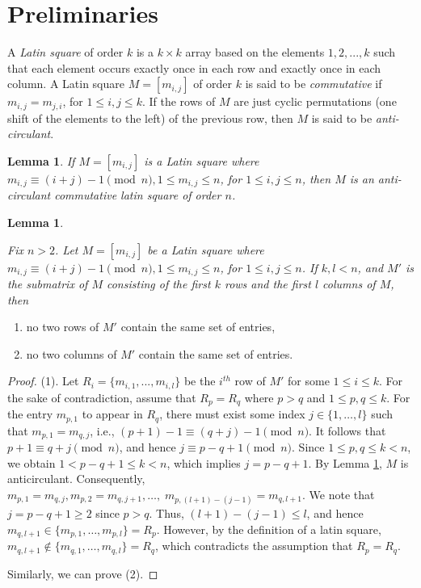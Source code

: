 \documentclass[12pt]{article}
\theoremstyle{definition}
\newtheorem{lem}[defn]{Lemma}
\begin{document}
\section{Preliminaries} 

A {\em Latin square} of order $k$ is a $k \times k$ array based on the elements $1, 2,...,k$ such that each element occurs exactly once in each row and exactly once in each column. A Latin square $M = [m_{i,j}]$ of order $k$ is said to be {\em commutative} if $m_{i,j} = m_{j,i}$, for $1 \leq i, j \leq k$. If the rows of $M$ are just cyclic permutations (one shift of the elements to the left) of the previous row, then $M$ is said to be {\em anti-circulant}.

\begin{lem}\label{Lemma 2.1}
{\em If $M = [m_{i,j}]$ is a Latin square where $m_{i,j} \equiv (i + j)-1 \pmod{n}, 1 \leq m_{i,j} \leq n$, for $1 \leq i, j \leq n$, then $M$ is an anti-circulant commutative latin square of order $n$.} 
\end{lem}

\begin{lem}\label{Lemma 2.2}
    {\em Fix $n>2$. Let $M = [m_{i,j}]$ be a Latin square where $m_{i,j} \equiv (i + j)-1 \pmod{n}, 1 \leq m_{i,j} \leq n$, for $1 \leq i, j \leq n$. If $k,l<n$, and $M'$ is the submatrix of $M$ consisting of the first $k$ rows and the first $l$ columns of $M$, then 
    \begin{enumerate}
        \item no two rows of $M'$ contain the same set of entries,
        \item no two columns of $M'$ contain the same set of entries.
    \end{enumerate}
    }
\end{lem}

\begin{proof}
(1). 
Let $R_i=\{m_{i,1},...,m_{i,l}\}$ be the $i^{th}$ row of $M'$ for some $1\leq i\leq k$.
For the sake of contradiction, assume that 
$R_p=R_{q}$ where $p> q$ and $1\leq p,q\leq k$.  
For the entry $m_{p,1}$ to appear in $R_q$, there must exist some index $j \in \{1, \dots, l\}$ such that
$m_{p,1}=m_{q,j}$, i.e.,
$
(p+1)-1 \equiv (q + j)-1 \pmod{n}.
$
It follows that
$p+1 \equiv q + j \pmod{n}$,
and hence
$j \equiv p - q + 1 \pmod{n}$.
Since $1 \le p, q \le k<n$, we obtain $1 < p - q + 1 \le k< n$, which implies
$
j = p - q + 1.
$
By Lemma \ref{Lemma 2.1}, $M$ is anticirculant.
Consequently, 
$m_{p,1}=m_{q,j},m_{p,2}=m_{q,j+1}, \dots,\; m_{p,(l+1)-(j-1)}=m_{q,l+1}$. 
We note that $j=p-q+1\ge2$ since $p>q$. 
Thus, $(l+1)-(j-1)\le l$, and hence $m_{q,l+1}\in\{m_{p,1},\dots,m_{p,l}\}=R_{p}$.
However, by the definition of a latin square,
$
m_{q,l+1}\notin\{m_{q,1},\dots,m_{q,l}\}=R_q
$, which contradicts the assumption that $R_p=R_q$.

Similarly, we can prove (2).
\end{proof}
\end{document}

